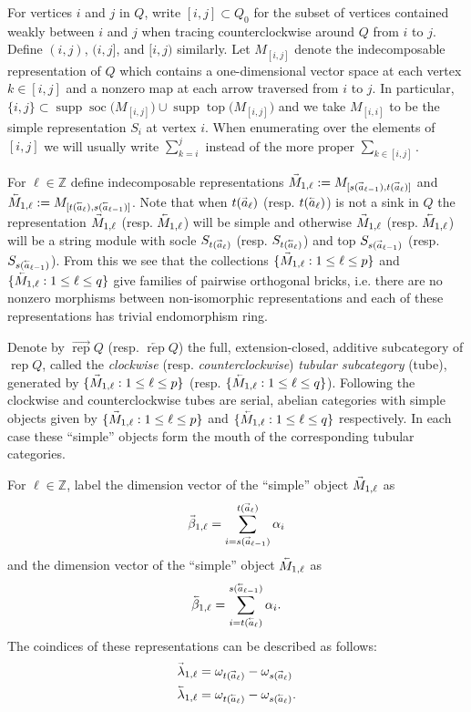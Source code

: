 \documentclass[12pt]{amsart}
\newcommand{\ZZ}{\mathbb{Z}}
\newcommand{\rep}{\operatorname{rep}}
\newcommand{\soc}{\operatorname{soc}}
\newcommand{\supp}{\operatorname{supp}}
\renewcommand{\top}{\operatorname{top}}
\renewcommand{\vec}[1]{\accentset{\shortrightarrow}{#1}}
\newcommand{\cev}[1]{\accentset{\shortleftarrow}{#1}}
\theoremstyle{remark}
\numberwithin{equation}{section}
\begin{document}
  For vertices $i$ and $j$ in $Q$, write $[i,j]\subset Q_0$ for the subset of vertices contained weakly between $i$ and $j$ when tracing counterclockwise around $Q$ from $i$ to $j$.  Define $(i,j)$, $(i,j]$, and $[i,j)$ similarly.  Let $M_{[i,j]}$ denote the indecomposable representation of $Q$ which contains a one-dimensional vector space at each vertex $k\in[i,j]$ and a nonzero map at each arrow traversed from $i$ to $j$.  In particular, $\{i,j\}\subset\supp\soc\big(M_{[i,j]}\big)\cup\supp\top\big(M_{[i,j]}\big)$ and we take $M_{[i,i]}$ to be the simple representation $S_i$ at vertex $i$.  When enumerating over the elements of $[i,j]$ we will usually write $\sum\limits_{k=i}^j$ instead of the more proper $\sum\limits_{k\in[i,j]}$.

  For $\ell\in\ZZ$ define indecomposable representations $\vec{M}_{1,\ell}:=M_{[s(\vec{a}_{\ell-1}),t(\vec{a}_\ell)]}$ and $\cev{M}_{1,\ell}:=M_{[t(\cev{a}_\ell),s(\cev{a}_{\ell-1})]}$.  Note that when $t(\vec{a}_\ell)$ (resp. $t(\cev{a}_\ell)$) is not a sink in $Q$ the representation $\vec{M}_{1,\ell}$ (resp. $\cev{M}_{1,\ell}$) will be simple and otherwise $\vec{M}_{1,\ell}$ (resp. $\cev{M}_{1,\ell}$) will be a string module with socle $S_{t(\vec{a}_\ell)}$ (resp. $S_{t(\cev{a}_\ell)}$) and top $S_{s(\vec{a}_{\ell-1})}$ (resp. $S_{s(\cev{a}_{\ell-1})}$).  From this we see that the collections $\{\vec{M}_{1,\ell}:1\le\ell\le p\}$ and $\{\cev{M}_{1,\ell}:1\le\ell\le q\}$ give families of pairwise orthogonal bricks, i.e. there are no nonzero morphisms between non-isomorphic representations and each of these representations has trivial endomorphism ring.

  Denote by $\overrightarrow{\rep}Q$ (resp. $\overleftarrow{\rep}Q$) the full, extension-closed, additive subcategory of $\rep Q$, called the \emph{clockwise} (resp. \emph{counterclockwise}) \emph{tubular subcategory} (tube), generated by $\{\vec{M}_{1,\ell}:1\le\ell\le p\}$ (resp. $\{\cev{M}_{1,\ell}:1\le\ell\le q\}$).  Following \cite[Section 3.1]{Rin84} the clockwise and counterclockwise tubes are serial, abelian categories with simple objects given by $\{\vec{M}_{1,\ell}:1\le\ell\le p\}$ and $\{\cev{M}_{1,\ell}:1\le\ell\le q\}$ respectively.  In each case these ``simple'' objects form the mouth of the corresponding tubular categories.

  For $\ell\in\ZZ$, label the dimension vector of the ``simple'' object $\vec{M}_{1,\ell}$ as
  \begin{equation}
    \vec{\beta}_{1,\ell}=\sum_{i=s(\vec{a}_{\ell-1})}^{t(\vec{a}_\ell)}\alpha_i
  \end{equation}
  and the dimension vector of the ``simple'' object $\cev{M}_{1,\ell}$ as
  \begin{equation}
    \cev{\beta}_{1,\ell}=\sum_{i=t(\cev{a}_\ell)}^{s(\cev{a}_{\ell-1})}\alpha_i.
  \end{equation}
  The coindices of these representations can be described as follows:
  \begin{align}
    \vec{\lambda}_{1,\ell}&=\omega_{t(\vec{a}_\ell)}-\omega_{s(\vec{a}_\ell)}\\
    \cev{\lambda}_{1,\ell}&=\omega_{t(\cev{a}_\ell)}-\omega_{s(\cev{a}_\ell)}.
  \end{align}
\end{document}
